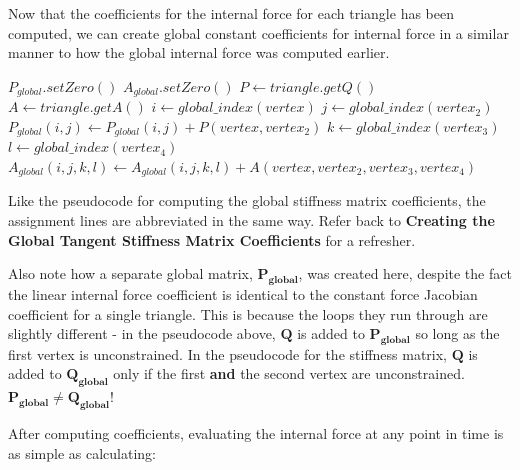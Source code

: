 \documentclass[twocolumn,10pt]{asme2ej}
\begin{document}
Now that the coefficients for the internal force for each triangle has been computed, we can create global constant coefficients for internal force in a similar manner to how the global internal force was computed earlier.

\bigskip
\begin{algorithmic}[1]
        \State $P_{global}.setZero()$
        \State $A_{global}.setZero()$
         \State $P \gets triangle.getQ()$
         \State $A \gets triangle.getA()$
                  \State $i \gets global\_index(vertex)$
                    \State $j \gets global\_index(vertex_2)$
                    \State $P_{global}(i,j) \gets P_{global}(i,j) + P(vertex, vertex_2)$
                          \State $k \gets global\_index(vertex_3)$
                              \State $l \gets global\_index(vertex_4)$
                              \State $A_{global}(i,j,k,l)  \gets A_{global}(i,j,k,l)+A(vertex, vertex_2, vertex_3, vertex_4)$
                            \EndFor
                      \EndFor
                    \EndFor
              \EndIf
            \EndFor
        \EndFor
    \EndFunction
\end{algorithmic}

Like the pseudocode for computing the global stiffness matrix coefficients, the assignment lines are abbreviated in the same way. Refer back to \textbf{Creating the Global Tangent Stiffness Matrix Coefficients} for a refresher.

Also note how a separate global matrix, $\bm{P_{global}}$, was created here, despite the fact the linear internal force coefficient is identical to the constant force Jacobian coefficient for a single triangle. This is because the loops they run through are slightly different - in the pseudocode above, $\bm{Q}$ is added to $\bm{P_{global}}$ so long as the first vertex is unconstrained. In the pseudocode for the stiffness matrix, $\bm{Q}$ is added to $\bm{Q_{global}}$ only if the first \textbf{and} the second vertex are unconstrained. $\bm{P_{global}} \neq \bm{Q_{global}}$!

After computing coefficients, evaluating the internal force at any point in time is as simple as calculating:
\end{document}
